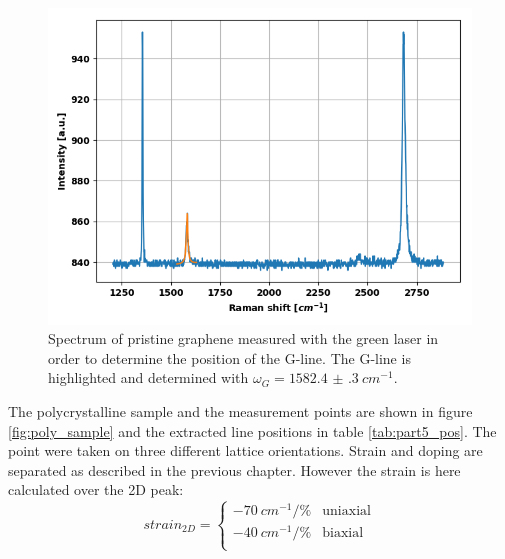 \documentclass[12pt,a4paper]{article}
\begin{document}
\begin{figure}
\centering
\includegraphics[scale=0.5]{Bilder/part6/prestine_green.png}
\caption{Spectrum of pristine graphene measured with the green laser in order to determine the position of the G-line. The G-line is highlighted and determined with $\omega_{G} = \SI{1582.4(3)}{cm^{-1}}$.}
\label{fig:pristine_green}
\end{figure}

The polycrystalline sample and the measurement points are shown in figure  \ref{fig:poly_sample} and the extracted line positions in table \ref{tab:part5_pos}. The point were taken on three different lattice orientations. Strain and doping are separated as described in the previous chapter. However the strain is here calculated over the 2D peak:
\begin{equation*}
  strain_{2D} = \begin{cases}
        \SI{-70}{cm^{-1}/\%} &\text{uniaxial} \\
        \SI{-40}{cm^{-1}/\%} &\text{biaxial} \\
        \end{cases}
\end{equation*}
\end{document}
